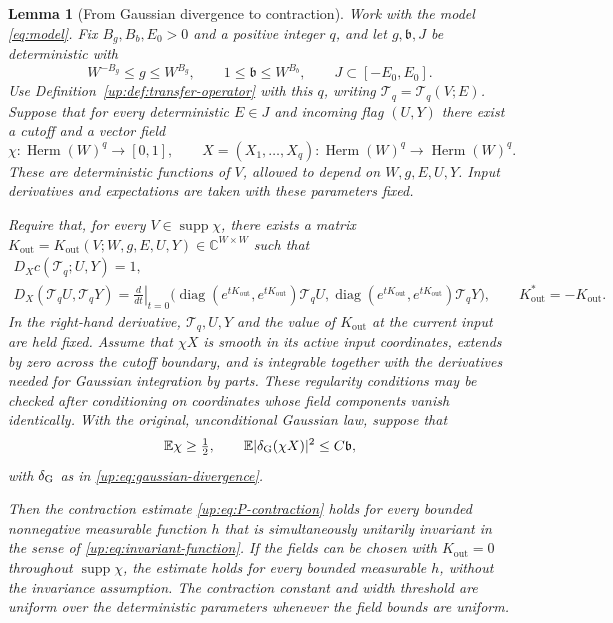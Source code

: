\documentclass[11pt]{article}
\numberwithin{equation}{section}
\newtheorem{lemma}[theorem]{Lemma}
\theoremstyle{remark}
\newcommand{\E}{\mathbb E}
\newcommand{\C}{\mathbb C}
\newcommand{\diag}{\operatorname{diag}}
\newcommand{\supp}{\operatorname{supp}}
\begin{document}
\begin{lemma}[From Gaussian divergence to contraction]\label{up:lem:angular}
Work with the model \eqref{eq:model}. Fix $B_g,B_b,E_0>0$ and a
positive integer $q$, and let $g,\mathfrak b,J$ be deterministic with
\[
 W^{-B_g}\le g\le W^{B_g},\qquad
 1\le\mathfrak b\le W^{B_b},\qquad J\subset[-E_0,E_0].
\]
Use Definition~\ref{up:def:transfer-operator} with this $q$, writing
$\mathcal T_q=\mathcal T_q(V;E)$.
Suppose that for every deterministic $E\in J$ and incoming flag
$(U,Y)$ there exist a cutoff and a vector field
\[
 \chi:\operatorname{Herm}(W)^q\longrightarrow[0,1],\qquad
 X=(X_1,\ldots,X_q):\operatorname{Herm}(W)^q
       \longrightarrow\operatorname{Herm}(W)^q.
\]
These are deterministic functions of $V$, allowed to depend on
$W,g,E,U,Y$. Input derivatives and expectations are taken with
these parameters fixed.

Require that, for every $V\in\supp\chi$, there exists a matrix
$K_{\mathrm{out}}=K_{\mathrm{out}}(V;W,g,E,U,Y)\in\C^{W\times W}$ such that
\begin{equation}\label{up:eq:angular-geometry}
 \begin{gathered}
 D_Xc(\mathcal T_q;U,Y)=1,\\
 D_X(\mathcal T_q U,\mathcal T_q Y)=\left.\frac{d}{dt}\right|_{t=0}
 \bigl(\diag(e^{tK_{\mathrm{out}}},e^{tK_{\mathrm{out}}})\mathcal T_q U,\diag(e^{tK_{\mathrm{out}}},e^{tK_{\mathrm{out}}})\mathcal T_q Y\bigr),
 \qquad K_{\mathrm{out}}^*=-K_{\mathrm{out}}.
 \end{gathered}
\end{equation}
In the right-hand derivative, $\mathcal T_q,U,Y$ and the value of
$K_{\mathrm{out}}$ at the current input are held fixed.
Assume that $\chi X$ is smooth in its active input coordinates,
extends by zero across the cutoff boundary, and is integrable
together with the derivatives needed for Gaussian integration by
parts. These regularity conditions may be checked after conditioning on
coordinates whose field components vanish identically. With the original,
unconditional Gaussian law, suppose that
\begin{equation}\label{up:eq:field}
 \E\chi\ge\tfrac12,\qquad
 \E|\delta_{\rm G}(\chi X)|^2\le C\mathfrak b,
\end{equation}
with $\delta_{\rm G}$ as in \eqref{up:eq:gaussian-divergence}.

Then the contraction estimate \eqref{up:eq:P-contraction} holds
for every bounded nonnegative measurable function $h$ that is
simultaneously unitarily invariant in the sense of
\eqref{up:eq:invariant-function}. If the fields can be chosen with
$K_{\mathrm{out}}=0$ throughout $\supp\chi$, the estimate holds for every bounded
measurable $h$, without the invariance assumption. The contraction
constant and width threshold are uniform over the deterministic
parameters whenever the field bounds are uniform.
\end{lemma}
\end{document}
